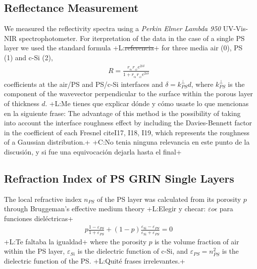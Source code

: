 \documentclass{article}
\newcommand{\notaL}[1]{{\color{blue}+L:#1+}}
\newcommand{\notaC}[1]{{\color{green}+C:#1+}}
\begin{document}
\subsection{Reflectance Measurement}
\label{sec:refl-meas}
We measured the reflectivity spectra using a {\em Perkin Elmer Lambda 950}
UV-Vis-NIR spectrophotometer. For iterpretation of the data in the
case of a single PS layer we used
the standard formula \cite{T8,T9} \notaL{\sout{referencia}} for three media air (0), PS
(1) and c-Si (2),
 \begin{eqnarray}\label{Eq:ECMR}
   R=\frac{r _ {_ {01}}r _ {_ {12}} e^{2i\delta}}{1+r _ {_ {01}}r _ {_ {12}} e^{2i\delta}}
\end{eqnarray}
coefficients at the air/PS and PS/c-Si interfaces \cite{T10,T11}
and $\delta=k_{PS}^\perp d$, where $k_{PS}^\perp$ is
the component of the wavevector perpendicular to the surface within
the porous layer of thickness $d$.
\notaL{Me tienes que explicar dónde y cómo usaste lo que mencionas en
  la siguiente frase:
The advantage of this method is
the possibility of taking into account the interface roughness effect
by including the Davies-Bennett factor in the coefficient of each
Fresnel cite{I17, I18, I19}, which represents the roughness of a
Gaussian distribution.} \notaC{No tenia ninguna relevancia en este 
punto de la discusión, y si fue una equivocación dejarla hasta el final}

\subsection{Refraction Index of PS GRIN Single Layers}
\label{sec:refraction-index-ps}
The local refractive index $n_{PS}$ of the PS layer was calculated from its
porosity $p$ through
Bruggeman's effective medium theory \cite{I20} \notaL{Elegir y checar:
  $\varepsilon o \epsilon$ para funciones dieléctricas}
\begin{eqnarray}\label{Eq:Brugg}
 p\frac{1-\varepsilon_{PS}} {1+\varepsilon_{PS}} + (1-p)
  \frac{\varepsilon_{\text{Si}} - \varepsilon_{PS}}
  {\varepsilon_{\text{Si}}+\varepsilon_{PS}}=0
\end{eqnarray}
\notaL{Te faltaba la igualdad}
where the porosity $p$ is the volume fraction of air within the PS
layer, $\varepsilon_{Si}$ is the dielectric function of c-Si, and
$\varepsilon_{PS}=n_{PS}^2$ is the dielectric function of the PS.
\notaL{Quité frases irrelevantes.}
\end{document}
